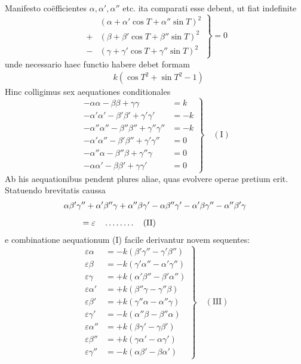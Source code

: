 Manifesto coëfficientes $\alpha,\alpha',\alpha''$ etc. ita comparati esse debent, ut fiat indefinite
\[
\left.\begin{aligned}
 &(\alpha+\alpha'\cos T+\alpha''\sin T)^2\\[5pt]
+&(\beta+\beta'\cos T+\beta''\sin T)^2\\[5pt]
-&(\gamma+\gamma'\cos T+\gamma''\sin T)^2
\end{aligned}\right\}=0
\]
unde necessario haec functio habere debet formam
\[
\begin{aligned}
&k(\cos T^2+\sin T^2-1)
\end{aligned}
\]
Hinc colligimus sex aequationes conditionales
\[
\left.\begin{aligned}
-\alpha\alpha-\beta\beta+\gamma\gamma&=k\\[5pt]
-\alpha'\alpha'-\beta'\beta'+\gamma'\gamma'&=-k\\[5pt]
-\alpha''\alpha''-\beta''\beta''+\gamma''\gamma''&=-k\\[5pt]
-\alpha'\alpha''-\beta'\beta''+\gamma'\gamma''&=0\\[5pt]
-\alpha''\alpha-\beta''\beta+\gamma''\gamma&=0\\[5pt]
-\alpha\alpha'-\beta\beta'+\gamma\gamma'&=0
\end{aligned}\right\}\quad\mathrm{(I)}
\]
Ab his aequationibus pendent plures aliae, quas evolvere operae pretium
erit. Statuendo brevitatis caussa
\[
\begin{aligned}
&\alpha\beta'\gamma''+\alpha'\beta''\gamma+\alpha''\beta\gamma'
-\alpha\beta''\gamma'-\alpha'\beta\gamma''-\alpha''\beta'\gamma
\\[6pt]
&\qquad{}=\varepsilon\quad\mathinner{.\,.\,.\,.\,.\,.\,.\,.}\quad\text{(II)}
\end{aligned}
\]
e combinatione aequationum (I) facile derivantur novem sequentes:
\[
\left.\begin{aligned}
\varepsilon\alpha&=-k(\beta'\gamma''-\gamma'\beta'')\\[5pt]
\varepsilon\beta&=-k(\gamma'\alpha''-\alpha'\gamma'')\\[5pt]
\varepsilon\gamma&=+k(\alpha'\beta''-\beta'\alpha'')\\[5pt]
\varepsilon\alpha'&=+k(\beta''\gamma-\gamma''\beta)\\[5pt]
\varepsilon\beta'&=+k(\gamma''\alpha-\alpha''\gamma)\\[5pt]
\varepsilon\gamma'&=-k(\alpha''\beta-\beta''\alpha)\\[5pt]
\varepsilon\alpha''&=+k(\beta\gamma'-\gamma\beta')\\[5pt]
\varepsilon\beta''&=+k(\gamma\alpha'-\alpha\gamma')\\[5pt]
\varepsilon\gamma''&=-k(\alpha\beta'-\beta\alpha')
\end{aligned}\right\}\quad\mathrm{(III)}
\]
